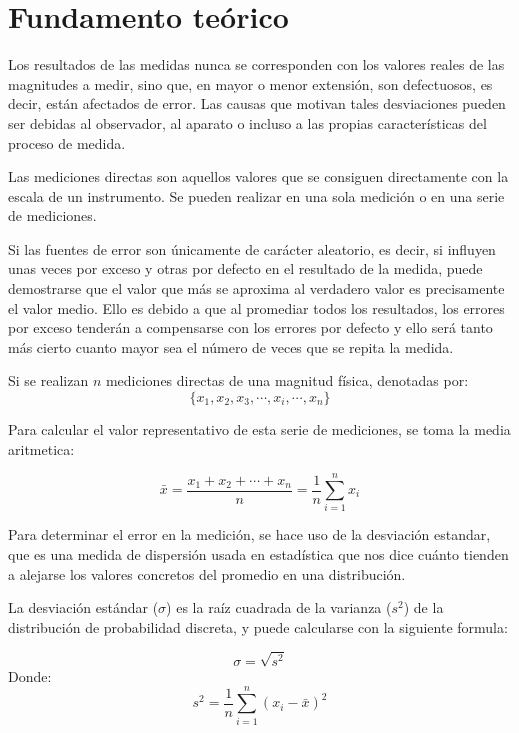 \documentclass[letter,twoside,11pt]{article}
\begin{document}
\section{Fundamento teórico}
Los resultados de las medidas nunca se corresponden con los valores reales de
las magnitudes a medir, sino que, en mayor o menor extensión, son defectuosos,
es decir, están afectados de error. Las causas que motivan tales desviaciones
pueden ser debidas al observador, al aparato o incluso a las propias
características del proceso de medida.

Las mediciones directas son aquellos valores que se consiguen directamente con
la escala de un instrumento. Se pueden realizar en una sola medición o en una
serie de mediciones.

Si las fuentes de error son únicamente de carácter aleatorio, es decir, si
influyen unas veces por exceso y otras por defecto en el resultado de la medida,
puede demostrarse que el valor que más se aproxima al verdadero valor es
precisamente el valor medio. Ello es debido a que al promediar todos los
resultados, los errores por exceso tenderán a compensarse con los errores por
defecto y ello será tanto más cierto cuanto mayor sea el número de veces que se
repita la medida.

Si se realizan $n$ mediciones directas de una magnitud física, denotadas
por:
\begin{equation}
    \{x_1,x_2,x_3,\cdots,x_i,\cdots,x_n\}
\end{equation}

Para calcular el valor representativo de esta serie de mediciones, se toma la
media aritmetica:

\begin{equation}
    \bar{x} = \frac{x_1+x_2+\cdots+x_n}{n} = \frac{1}{n}\sum_{i=1}^{n} x_i
\end{equation}

Para determinar el error en la medición, se hace uso de la desviación estandar,
que es una medida de dispersión usada en estadística que nos dice cuánto tienden
a alejarse los valores concretos del promedio en una distribución.

La desviación estándar ($\sigma$) es la raíz cuadrada de la varianza ($s^2$) de
la distribución de probabilidad discreta, y puede calcularse con la siguiente
formula:

\begin{equation}
    \sigma = \sqrt{s^2}
\end{equation}
Donde:
\begin{equation}
    s^2 = \frac{1}{n}\sum_{i=1}^{n} (x_i-\bar{x})^2
\end{equation}
\end{document}
